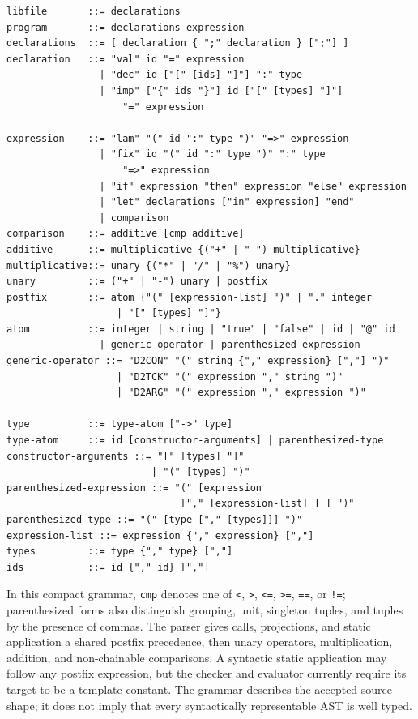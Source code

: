 \documentclass[11pt]{article}
\begin{document}
\begin{verbatim}
libfile       ::= declarations
program       ::= declarations expression
declarations  ::= [ declaration { ";" declaration } [";"] ]
declaration   ::= "val" id "=" expression
                | "dec" id ["[" [ids] "]"] ":" type
                | "imp" ["{" ids "}"] id ["[" [types] "]"]
                    "=" expression

expression    ::= "lam" "(" id ":" type ")" "=>" expression
                | "fix" id "(" id ":" type ")" ":" type
                    "=>" expression
                | "if" expression "then" expression "else" expression
                | "let" declarations ["in" expression] "end"
                | comparison
comparison    ::= additive [cmp additive]
additive      ::= multiplicative {("+" | "-") multiplicative}
multiplicative::= unary {("*" | "/" | "%") unary}
unary         ::= ("+" | "-") unary | postfix
postfix       ::= atom {"(" [expression-list] ")" | "." integer
                   | "[" [types] "]"}
atom          ::= integer | string | "true" | "false" | id | "@" id
                | generic-operator | parenthesized-expression
generic-operator ::= "D2CON" "(" string {"," expression} [","] ")"
                   | "D2TCK" "(" expression "," string ")"
                   | "D2ARG" "(" expression "," expression ")"

type          ::= type-atom ["->" type]
type-atom     ::= id [constructor-arguments] | parenthesized-type
constructor-arguments ::= "[" [types] "]"
                         | "(" [types] ")"
parenthesized-expression ::= "(" [expression
                              ["," [expression-list] ] ] ")"
parenthesized-type ::= "(" [type ["," [types]]] ")"
expression-list ::= expression {"," expression} [","]
types         ::= type {"," type} [","]
ids           ::= id {"," id} [","]
\end{verbatim}

In this compact grammar, \texttt{cmp} denotes one of \texttt{<},
\texttt{>}, \texttt{<=}, \texttt{>=}, \texttt{==}, or \texttt{!=};
parenthesized forms also distinguish grouping, unit, singleton tuples, and
tuples by the presence of commas. The parser gives calls, projections, and
static application a shared postfix precedence, then unary operators,
multiplication, addition, and non-chainable comparisons. A syntactic static
application may follow any postfix expression, but the checker and evaluator
currently require its target to be a template constant. The grammar describes
the accepted source shape; it does not imply that every syntactically
representable AST is well typed.
\end{document}

